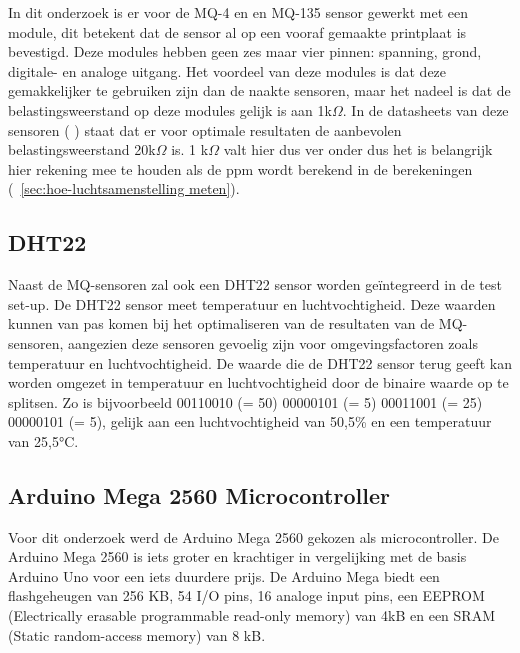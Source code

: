 In dit onderzoek is er voor de MQ-4 en en MQ-135 sensor gewerkt met een module, dit betekent dat de sensor al op een vooraf gemaakte printplaat is bevestigd. Deze modules hebben geen zes maar vier pinnen: spanning, grond, digitale- en analoge uitgang. Het voordeel van deze modules is dat deze gemakkelijker te gebruiken zijn dan de naakte sensoren, maar het nadeel is dat de belastingsweerstand op deze modules gelijk is aan 1k$\Omega$. In de datasheets van deze sensoren (
) staat dat er voor optimale resultaten de aanbevolen belastingsweerstand 20k$\Omega$ is. 1 k$\Omega$ valt hier dus ver onder dus het is belangrijk hier rekening mee te houden als de ppm wordt berekend in de berekeningen (~\ref{sec:hoe-luchtsamenstelling meten}).


\subsection{DHT22}%
\label{subsec:dht22}

Naast de MQ-sensoren zal ook een DHT22 sensor worden geïntegreerd in de test set-up. De DHT22 sensor meet temperatuur en luchtvochtigheid. Deze waarden kunnen van pas komen bij het optimaliseren van de resultaten van de MQ-sensoren, aangezien deze sensoren gevoelig zijn voor omgevingsfactoren zoals temperatuur en luchtvochtigheid.
De waarde die de DHT22 sensor terug geeft kan worden omgezet in temperatuur en luchtvochtigheid door de binaire waarde op te splitsen.
Zo is bijvoorbeeld 00110010 (= 50) 00000101 (= 5) 00011001 (= 25) 00000101 (= 5), gelijk aan een luchtvochtigheid van 50,5\% en een temperatuur van 25,5°C.

\subsection{Arduino Mega 2560 Microcontroller}%
\label{subsec:arduino}

Voor dit onderzoek werd de Arduino Mega 2560 gekozen als microcontroller. De Arduino Mega 2560 is iets groter en krachtiger in vergelijking met de basis Arduino Uno voor een iets duurdere prijs. De Arduino Mega biedt een flashgeheugen van 256 KB, 54 I/O pins, 16 analoge input pins, een EEPROM (Electrically erasable programmable read-only memory) van 4kB en een SRAM (Static random-access memory) van 8 kB.


